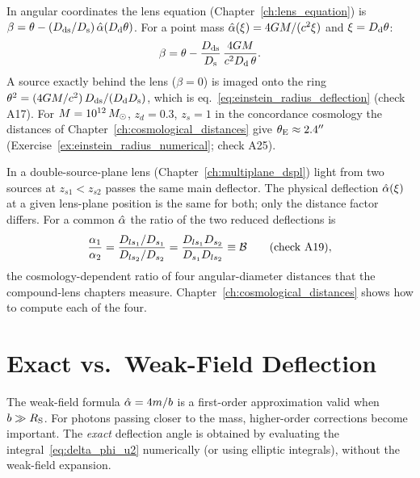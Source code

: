 \begin{derivation}
In angular coordinates the lens equation (Chapter~\ref{ch:lens_equation}) is
$\beta = \theta - (D_{\mathrm{ds}}/D_{\mathrm{s}})\,\hat{\alpha}(D_{\mathrm{d}}\theta)$.  For a point mass
$\hat{\alpha}(\xi) = 4G M/(c^2\xi)$ and $\xi = D_{\mathrm{d}}\theta$:
\[
    \beta = \theta - \frac{D_{\mathrm{ds}}}{D_{\mathrm{s}}}\,\frac{4G M}{c^2D_{\mathrm{d}}\,\theta}.
\]
A source exactly behind the lens ($\beta = 0$) is imaged onto the ring
$\theta^2 = (4G M/c^2)\,D_{\mathrm{ds}}/(D_{\mathrm{d}}D_{\mathrm{s}})$, which is
eq.~\eqref{eq:einstein_radius_deflection} (check A17).  For
$M = 10^{12}\,M_{\odot}$, $z_d = 0.3$, $z_s = 1$ in the concordance cosmology the
distances of Chapter~\ref{ch:cosmological_distances} give $\theta_{\mathrm{E}} \approx 2.4''$
(Exercise~\ref{ex:einstein_radius_numerical}; check A25).
\end{derivation}

\begin{bridge}
In a double-source-plane lens (Chapter~\ref{ch:multiplane_dspl}) light from two
sources at $z_{s1} < z_{s2}$ passes the same main deflector.  The physical
deflection $\hat{\alpha}(\xi)$ at a given lens-plane position is the same for both;
only the distance factor differs.  For a common $\hat{\alpha}$ the ratio of the two
reduced deflections is
\[
    \frac{\alpha_1}{\alpha_2} = \frac{D_{ls_1}/D_{s_1}}{D_{ls_2}/D_{s_2}}
    = \frac{D_{ls_1}D_{s_2}}{D_{s_1}D_{ls_2}} \equiv \mathcal{B}
    \qquad(\text{check A19}),
\]
the cosmology-dependent ratio of four angular-diameter distances that the
compound-lens chapters measure.  Chapter~\ref{ch:cosmological_distances} shows how to compute each of the
four.
\end{bridge}

\section{Exact vs.\ Weak-Field Deflection}
\label{sec:exact_vs_approx}

The weak-field formula $\hat{\alpha} = 4m/b$ is a first-order approximation
valid when $b \gg R_{\mathrm{S}}$.  For photons passing closer to the mass, higher-order
corrections become important.  The \textit{exact} deflection angle is
obtained by evaluating the integral~\eqref{eq:delta_phi_u2} numerically
(or using elliptic integrals), without the weak-field expansion.

